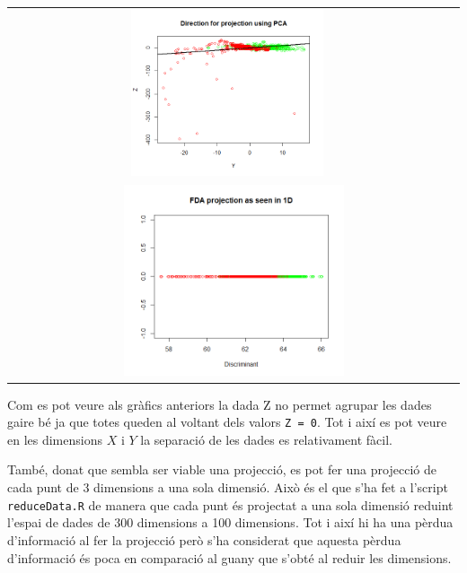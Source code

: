 \documentclass[a4paper]{article}
\begin{document}
\begin{longtable}{cc}
	\includegraphics[width=0.45\textwidth]{images/PCA_YZ} \\
	\multicolumn{2}{c}{\includegraphics[width=0.5\textwidth]{images/FDA_projection}}
\end{longtable}

Com es pot veure als gràfics anteriors la dada Z no permet agrupar les dades gaire bé ja que totes queden al voltant dels valors \verb|Z = 0|. Tot i així es pot veure en les dimensions $X$ i $Y$ la separació de les dades es relativament fàcil. 

També, donat que sembla ser viable una projecció, es pot fer una projecció de cada punt de 3 dimensions a una sola dimensió. Això és el que s'ha fet a l'script \texttt{reduceData.R} de manera que cada punt és projectat a una sola dimensió reduint l'espai de dades de 300 dimensions a 100 dimensions. Tot i així hi ha una pèrdua d'informació al fer la projecció però s'ha considerat que aquesta pèrdua d'informació és poca en comparació al guany que s'obté al reduir les dimensions.
\end{document}
